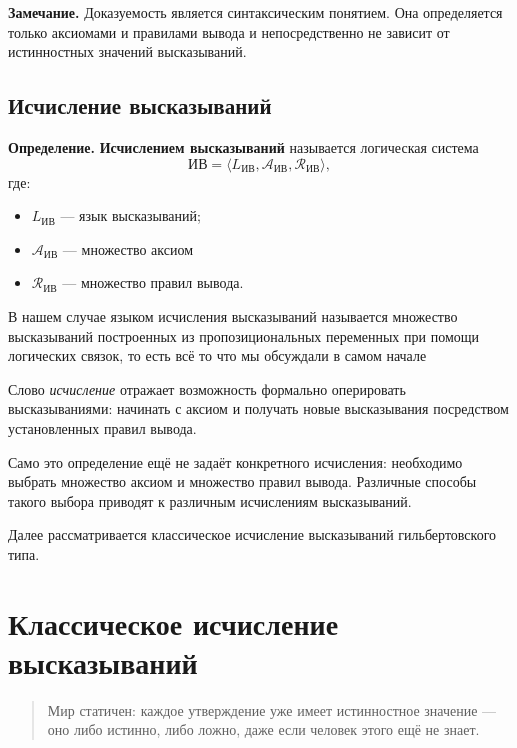 \documentclass[12pt,a4paper,oneside,openany]{book}
\theoremstyle{definition}
\theoremstyle{plain}
\theoremstyle{remark}
\begin{document}
\textbf{Замечание.}
Доказуемость является синтаксическим понятием. Она определяется только
аксиомами и правилами вывода и непосредственно не зависит от
истинностных значений высказываний.

\subsection{Исчисление высказываний}

\textbf{Определение.}
\textbf{Исчислением высказываний} называется логическая система
\[
\mathrm{ИВ}
=
\langle
L_{\mathrm{ИВ}},
\mathcal{A}_{\mathrm{ИВ}},
\mathcal{R}_{\mathrm{ИВ}}
\rangle,
\]
где:
\begin{itemize}
    \item \(L_{\mathrm{ИВ}}\) --- язык высказываний;
    \item \(\mathcal{A}_{\mathrm{ИВ}}\) --- множество аксиом
    \item \(\mathcal{R}_{\mathrm{ИВ}}\) --- множество правил вывода.
\end{itemize}

\vspace{5mm}

В нашем случае языком исчисления высказываний называется множество высказываний построенных из пропозициональных
переменных при помощи логических связок, то есть всё то что мы обсуждали в самом начале

\vspace{5mm}



Слово \textit{исчисление} отражает возможность формально оперировать
высказываниями: начинать с аксиом и получать новые высказывания
посредством установленных правил вывода.

\vspace{7mm}

Само это определение ещё не задаёт конкретного исчисления: необходимо
выбрать множество аксиом и множество правил вывода. Различные способы
такого выбора приводят к различным исчислениям высказываний.

Далее рассматривается классическое исчисление высказываний
гильбертовского типа.


\section{Классическое исчисление высказываний}

\begin{quote}
Мир статичен: каждое утверждение уже имеет истинностное значение — оно либо истинно, либо ложно, даже если человек этого ещё не знает.
\end{quote}
\end{document}
